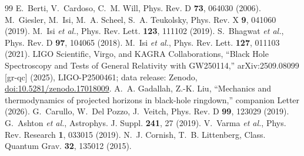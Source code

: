 \documentclass[aps,prd,twocolumn,superscriptaddress,nofootinbib,longbibliography]{revtex4-2}
\begin{document}
\begin{thebibliography}{99}
 E.~Berti, V.~Cardoso, C.~M. Will, Phys. Rev. D \textbf{73}, 064030 (2006).
 M.~Giesler, M.~Isi, M.~A. Scheel, S.~A. Teukolsky, Phys. Rev. X \textbf{9}, 041060 (2019).
 M.~Isi \emph{et al.}, Phys. Rev. Lett. \textbf{123}, 111102 (2019).
 S.~Bhagwat \emph{et al.}, Phys. Rev. D \textbf{97}, 104065 (2018).
 M.~Isi \emph{et al.}, Phys. Rev. Lett. \textbf{127}, 011103 (2021).
 LIGO Scientific, Virgo, and KAGRA Collaborations, ``Black Hole Spectroscopy and Tests of General Relativity with GW250114,'' arXiv:2509.08099 [gr-qc] (2025), LIGO-P2500461; data release: Zenodo, \href{https://doi.org/10.5281/zenodo.17018009}{doi:10.5281/zenodo.17018009}.
 A.~A. Gadallah, Z.-K. Liu, ``Mechanics and thermodynamics of projected horizons in black-hole ringdown,'' companion Letter (2026).
 G.~Carullo, W.~Del Pozzo, J.~Veitch, Phys. Rev. D \textbf{99}, 123029 (2019).
 G.~Ashton \emph{et al.}, Astrophys. J. Suppl. \textbf{241}, 27 (2019).
 V.~Varma \emph{et al.}, Phys. Rev. Research \textbf{1}, 033015 (2019).
 N.~J. Cornish, T.~B. Littenberg, Class. Quantum Grav. \textbf{32}, 135012 (2015).
\end{thebibliography}
\end{document}
